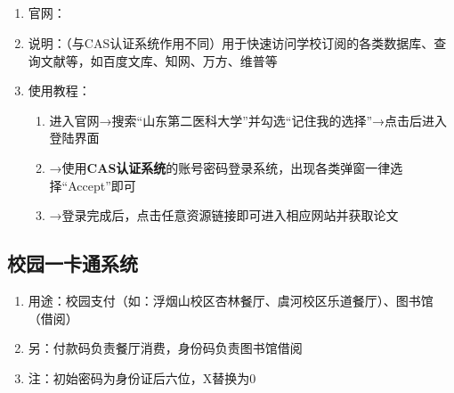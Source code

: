 \subsection[CARSI系统]{\textbf{}}
\label{carsi_system}
\begin{enumerate}
    \item 官网：
    \item 说明：（与CAS认证系统作用不同）用于快速访问学校订阅的各类数据库、查询文献等，如百度文库、知网、万方、维普等
    \item 使用教程：
          \begin{enumerate}
              \item 进入官网→搜索“山东第二医科大学”并勾选“记住我的选择”→点击后进入登陆界面\footnotemark
              \item →使用\textbf{CAS认证系统}的账号密码登录系统，出现各类弹窗一律选择“Accept”即可\footnotemark
              \item →登录完成后，点击任意资源链接即可进入相应网站并获取论文
          \end{enumerate}
\end{enumerate}

\subsection[校园一卡通系统]{校园一卡通系统}
\label{union_card}
\begin{enumerate}
    \item 用途：校园支付（如：浮烟山校区杏林餐厅、虞河校区乐道餐厅）\footnotemark、图书馆（借阅）
    \item 另：付款码负责餐厅消费，身份码负责图书馆借阅
    \item 注：初始密码为身份证后六位，X替换为0
\end{enumerate}

